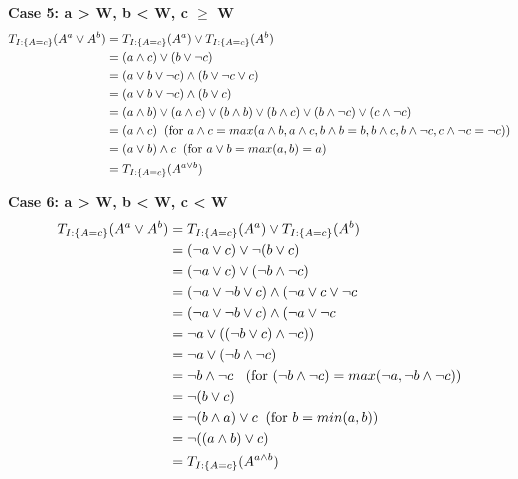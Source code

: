 \documentclass[part1.tex]{subfiles}
\begin{document}
{\bfseries Case 5: a > W, b < W, c $\ge$ W}
\begin{align*}
        T_{I:\{A = c\}}(A^{a} \vee A^{b}) 
                 &= T_{I:\{A = c\}}(A^{a}) \vee T_{I:\{A = c\}}(A^{b}) \\
                 &= (a \wedge c) \vee (b \vee \neg{c}) \\
                 &= (a \vee b \vee \neg{c}) \wedge (b \vee \neg{c} \vee c)\\
                 &= (a \vee b \vee \neg{c}) \wedge (b \vee c)\\
                 &= (a \wedge b) \vee (a \wedge c) \vee (b \wedge
                        b) \vee (b \wedge c) \vee (b \wedge \neg{c}) \vee (c \wedge
                        \neg{c})\\            
                 &= (a \wedge c) \text{\: (for $a \wedge c = max(a \wedge
                        b, a \wedge c, b \wedge
                        b = b, b \wedge c, b \wedge \neg{c}, c \wedge
                        \neg{c} = \neg{c})$)}\\        
                 &= (a \vee b) \wedge c \text{\: (for $a
                        \vee b = max(a,b) = a$)} \\
                 &= T_{I:\{A = c\}}(A^{a \vee b}) \\
\end{align*}

{\bfseries Case 6: a > W, b < W, c < W}
\begin{align*}
        T_{I:\{A = c\}}(A^{a} \vee A^{b}) 
                 &= T_{I:\{A = c\}}(A^{a}) \vee T_{I:\{A = c\}}(A^{b}) \\
                 &= (\neg{a} \vee c) \vee \neg{(b \vee c)} \\
                 &=  (\neg{a} \vee c) \vee (\neg{b} \wedge \neg{c})\\
                 &= (\neg{a} \vee \neg{b} \vee c) \wedge (\neg{a} \vee c \vee \neg{c}\\
                 &= (\neg{a} \vee \neg{b} \vee c) \wedge (\neg{a} \vee \neg{c}\\
                 &= \neg{a} \vee ((\neg{b} \vee c) \wedge \neg{c}))\\
                 &= \neg{a} \vee (\neg{b} \wedge \neg{c})\\
                 &= \neg{b} \wedge \neg{c} \text{
        \: (for $(\neg{b} \wedge \neg{c}) = max(\neg{a}, \neg{b} \wedge \neg{c})$)}\\
                 &= \neg{(b \vee c)}\\
                 &= \neg{(b \wedge a) \vee c} \text{\: (for $b = min(a,b)$)}\\
                 &= \neg{((a \wedge b) \vee c)}\\
                 &= T_{I:\{A = c\}}(A^{a \wedge b}) \\
\end{align*}
\end{document}
